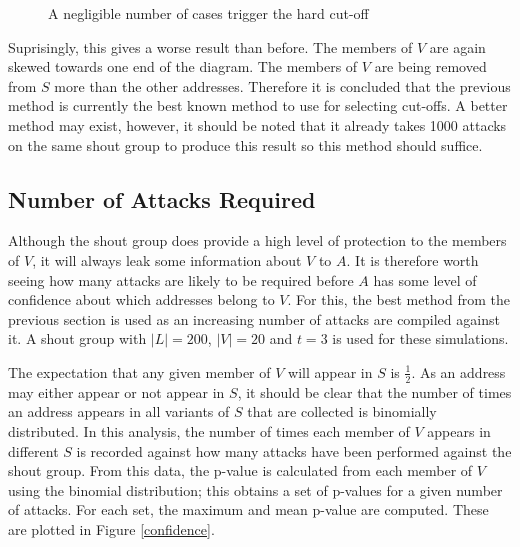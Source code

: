 \documentclass[ %
                    author={Luke Murray},
                supervisor={Dr. Simon Hollis},
                     title={Shadow Peer-to-Peer Networks},
                  subtitle={},
                    degree={MEng},
                      year={2013} ]{thesis}
\begin{document}
\begin{figure}[h]
\begin{minipage}[b]{0.4\linewidth}
        \caption{A negligible number of cases trigger the hard cut-off}
        \label{threshold_attack_dynamic2}
    \end{minipage}
\end{figure}

Suprisingly, this gives a worse result than before. The members of $V$ are again skewed towards one end of the diagram. The members of $V$ are being removed from $S$ more than the other addresses. Therefore it is concluded that the previous method is currently the best known method to use for selecting cut-offs. A better method may exist, however, it should be noted that it already takes 1000 attacks on the same shout group to produce this result so this method should suffice.

\subsection{Number of Attacks Required}

Although the shout group does provide a high level of protection to the members of $V$, it will always leak some information about $V$ to $A$. It is therefore worth seeing how many attacks are likely to be required before $A$ has some level of confidence about which addresses belong to $V$. For this, the best method from the previous section is used as an increasing number of attacks are compiled against it. A shout group with $|L| = 200$, $|V| = 20$ and $t = 3$ is used for these simulations.

The expectation that any given member of $V$ will appear in $S$ is $\frac{1}{2}$. As an address may either appear or not appear in $S$, it should be clear that the number of times an address appears in all variants of $S$ that are collected is binomially distributed. In this analysis, the number of times each member of $V$ appears in different $S$ is recorded against how many attacks have been performed against the shout group. From this data, the p-value is calculated from each member of $V$ using the binomial distribution; this obtains a set of p-values for a given number of attacks. For each set, the maximum and mean p-value are computed. These are plotted in Figure \ref{confidence}.
\end{document}
